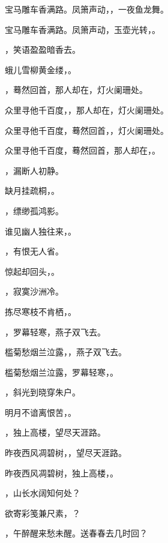 \documentclass[12pt, a4paper, addpoints, answers]{exam}
\begin{document}
\begin{questions}
\question[3] 宝马雕车香满路。凤箫声动，，一夜鱼龙舞。

\question[3] 宝马雕车香满路。凤箫声动，玉壶光转，。

\question[3] ，笑语盈盈暗香去。

\question[3] 蛾儿雪柳黄金缕，。

\question[3] ，蓦然回首，那人却在，灯火阑珊处。

\question[3] 众里寻他千百度，，那人却在，灯火阑珊处。

\question[3] 众里寻他千百度，蓦然回首，，灯火阑珊处。

\question[3] 众里寻他千百度，蓦然回首，那人却在，。

\question[3] ，漏断人初静。

\question[3] 缺月挂疏桐，。

\question[3] ，缥缈孤鸿影。

\question[3] 谁见幽人独往来，。

\question[3] ，有恨无人省。

\question[3] 惊起却回头，。

\question[3] ，寂寞沙洲冷。

\question[3] 拣尽寒枝不肯栖，。

\question[3] ，罗幕轻寒，燕子双飞去。

\question[3] 槛菊愁烟兰泣露，，燕子双飞去。

\question[3] 槛菊愁烟兰泣露，罗幕轻寒，。

\question[3] ，斜光到晓穿朱户。

\question[3] 明月不谙离恨苦，。

\question[3] ，独上高楼，望尽天涯路。

\question[3] 昨夜西风凋碧树，，望尽天涯路。

\question[3] 昨夜西风凋碧树，独上高楼，。

\question[3] ，山长水阔知何处？

\question[3] 欲寄彩笺兼尺素，？

\question[3] ，午醉醒来愁未醒。送春春去几时回？


\end{questions}
\end{document}
